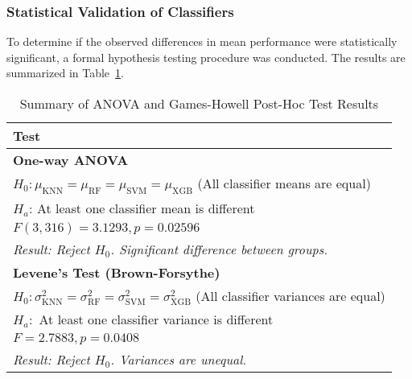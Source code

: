 \subsubsection{Statistical Validation of Classifiers}
To determine if the observed differences in mean performance were statistically significant, a formal hypothesis testing procedure was conducted. The results are summarized in Table~\ref{tab:cls_agh}.
\begin{table}[tb]
    \captionsetup{skip=5pt}
    \centering
    \caption{Summary of ANOVA and Games-Howell Post-Hoc Test Results}
    \label{tab:cls_agh}
    \begin{tabular}{l}
        \toprule
        \textbf{Test}                                                                                                      \\
        \midrule
        \textbf{One-way ANOVA}                                                                                             \\
        \quad \(H_0: \mu_{\textrm{KNN}} = \mu_{\textrm{RF}} = \mu_{\textrm{SVM}} = \mu_{\textrm{XGB}}\) (All classifier means are equal)                         \\
        \quad \(H_a\): At least one classifier mean is different                                                             \\
        \quad \(F(3, 316) = 3.1293, p = 0.02596\)                                                                            \\
        \quad \textit{Result: Reject \(H_0\). Significant difference between groups.}                                        \\
        \midrule
        \textbf{Levene's Test (Brown-Forsythe)}                                                                            \\
        \quad \(H_0: \sigma^2_{\textrm{KNN}} = \sigma^2_{\textrm{RF}} = \sigma^2_{\textrm{SVM}} = \sigma^2_{\textrm{XGB}}\) (All classifier variances are equal) \\
        \quad \(H_a:\) At least one classifier variance is different                                                         \\
        \quad \(F = 2.7883, p = 0.0408\)                                                                                     \\
        \quad \textit{Result: Reject \(H_0\). Variances are unequal.}                                                        \\

\end{tabular}
\end{table}
